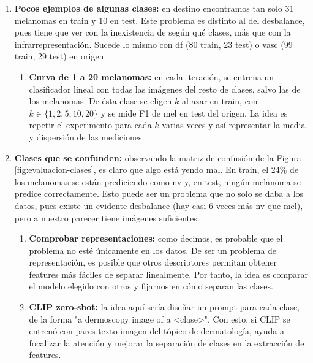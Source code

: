 \documentclass[10pt,a4paper]{article}
\renewcommand{\_}{\guionbajo\allowbreak}
\begin{document}
\begin{enumerate}
\begin{enumerate}
\begin{enumerate}
                con un parámetro $\lambda \in [0,1]$ razonable, de la forma $\textbf{x} = \lambda \textbf{x}_1 + (1-\lambda)\textbf{x}_2$; 
                $y = \lambda y_1 + (1-\lambda)y_2$. Esto puede generar imágenes con poco sentido semántico, pero aumenta la cantidad de datos. 
            \end{enumerate}
            \textbf{Nota:} ambos métodos son complementarios también. El segundo, no funcionaría sin el primero. Y el efecto del primero, no sería
            tan positivo sin el segundo. 
    \end{enumerate}

    \item \textbf{Pocos ejemplos de algunas clases:} en destino encontramos tan solo 31 melanomas en train y 10 en test. Este problema es 
    distinto al del desbalance, pues tiene que ver con la inexistencia de según qué clases, más que con la infrarrepresentación. Sucede lo
    mismo con df (80 train, 23 test) o vasc (99 train, 29 test) en origen.

    \begin{enumerate}
        \item \textbf{Curva de 1 a 20 melanomas:} en cada iteración, se entrena un clasificador lineal con todas las imágenes del resto de clases,
        salvo las de los melanomas. De ésta clase se eligen $k$ al azar en train, con $k\in \{1, 2, 5, 10, 20\}$ y se mide F1 de mel en test del origen. 
        La idea es repetir el experimento para cada $k$ varias veces y así representar la media y dispersión de las mediciones. 
    \end{enumerate}

    \item \textbf{Clases que se confunden:} observando la matriz de confusión de la Figura \ref{fig:evaluacion-clases}, es claro que algo está 
    yendo mal. En train, el 24\% de los melanomas se están prediciendo como nv y, en test, ningún melanoma se predice correctamente. Esto puede 
    ser un problema que no solo se daba a los datos, pues existe un evidente desbalance (hay casi 6 veces más nv que mel), pero a nuestro parecer
    tiene imágenes suficientes. 

    \begin{enumerate}
        \item \textbf{Comprobar representaciones:} como decimos, es probable que el problema no esté únicamente en los datos. De ser un problema 
        de representación, es posible que otros descriptores permitan obtener features más fáciles de separar linealmente. Por tanto, la idea 
        es comparar el modelo elegido con otros y fijarnos en cómo separan las clases. 
        \item \textbf{CLIP zero-shot:} la idea aquí sería diseñar un prompt para cada clase, de la forma "a dermoscopy image of a <clase>". 
        Con esto, si CLIP se entrenó con pares texto-imagen del tópico de dermatología, ayuda a focalizar la atención y mejorar la separación 
        de clases en la extracción de features. 


\end{enumerate}
\end{enumerate}
\end{document}
